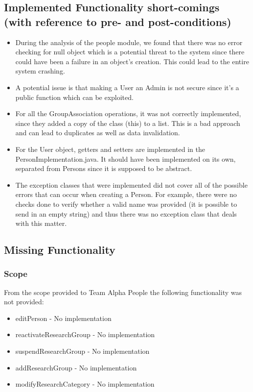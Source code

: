 \documentclass{article}
\begin{document}
	\subsection{Implemented Functionality short-comings (with reference to pre- and post-conditions)}
	\begin{itemize}
		
		\item During the analysis of the people module, we found that there was no error checking for null object which is a potential threat to the system since there could have been a failure in an object's creation. This could lead to the entire system crashing.
	\item A potential issue is that making a User an Admin is not secure since it's a public function which can be exploited.
	\item For all the GroupAssociation operations, it was not correctly implemented, since they added a copy of the class (this) to a list. This is a bad approach and can lead to duplicates as well as data invalidation.
	\item For the User object, getters and setters are implemented in the PersonImplementation.java. It should have been implemented on its own, separated from Persons since it is supposed to be abstract. 
	\item The exception classes that were implemented did not cover all of the possible errors that can occur when creating a Person. For example, there were no checks done to verify whether a valid name was provided (it is possible to send in an empty string) and thus there was no exception class that deals with this matter.
	
	\end{itemize}
	
	\subsection{Missing Functionality}
	\subsubsection{Scope}
	From the scope provided to Team Alpha People the following functionality was not provided:
	\begin{itemize}
		\item editPerson - No implementation
		\item reactivateResearchGroup - No implementation
		\item suspendResearchGroup - No implementation
		\item addResearchGroup - No implementation
		\item modifyResearchCategory - No implementation
	\end{itemize}
	
\end{document}
